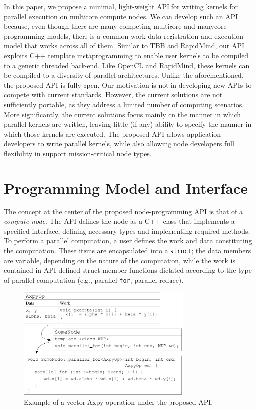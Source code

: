 \documentclass[10pt,conference,letterpaper]{IEEEtran}
\begin{document}
In this paper, we propose a minimal, light-weight API for writing kernels for parallel execution on multicore compute nodes. We can develop such an API because, even though there are many competing multicore and manycore programming models, there is a common work-data registration and execution model that works across all of them.  Similar to TBB and RapidMind, our API exploits C++ template metaprogramming to enable user kernels to be compiled to a generic threaded back-end. Like OpenCL and RapidMind, these kernels can be compiled to a diversity of parallel architectures. Unlike the aforementioned, the proposed API is fully open. Our motivation is not in developing new APIs to compete with current standards. However, the current solutions are not sufficiently portable, as they address a limited number of computing scenarios. More significantly, the current solutions focus mainly on the manner in which parallel kernels are written, leaving little (if any) ability to specify the manner in which those kernels are executed. The proposed API allows application developers to write parallel kernels, while also allowing node developers full flexibility in support mission-critical node types.

\section{Programming Model and Interface}


The concept at the center of the proposed node-programming API is that of a \emph{compute node}. The API defines the node as a C++ class that implements a specified interface, defining necessary types and implementing required methods. To perform a parallel computation, a user defines the work and data constituting the computation. These items are encapsulated into a \verb!struct!; the data members are variable, depending on the nature of the computation, while the work is contained in API-defined struct member functions dictated according to the type of parallel computation (e.g., parallel \verb!for!, parallel reduce). 

\begin{figure}[h]
	\centerline{\includegraphics[width=8.5cm]{AxpyExample.pdf} }
	\caption{Example of a vector Axpy operation under the proposed API.}
	\label{fig:axpy}
\end{figure}
\end{document}
